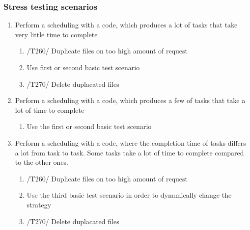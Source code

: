 {		
		     
		   \subsubsection{Stress testing scenarios}
		   
		   \begin{enumerate}
		   	 \item Perform a scheduling with a code, which produces a lot of tasks that take very little time to complete
		   	   \begin{enumerate}
		   	   \item /T260/ Duplicate files on too high amount of request
		   			\item Use first or second basic test scenario 
		   			\item /T270/ Delete duplacated files
		   			
		   	   \end{enumerate}
		   	\item Perform a scheduling with a code, which produces a few of tasks that take a lot of time to complete
		   	
		   	   \begin{enumerate}
		   			\item Use the first or second basic test scenario
		   	   \end{enumerate}
		   	\item Perform a scheduling with a code, where the completion time of tasks differs a lot from task to task. Some tasks take a lot of time to complete compared to the other ones.
		      	\begin{enumerate}
		      		\item /T260/ Duplicate files on too high amount of request
		   			\item Use the third basic test scenario  in order to dynamically change the strategy
		   			\item /T270/ Delete duplacated files
		      	\end{enumerate}
		   \end{enumerate}	
}